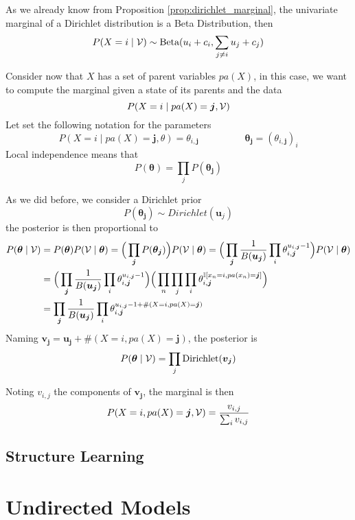 As we already know from Proposition \ref{prop:dirichlet_marginal}, the univariate marginal of a Dirichlet distribution is a
Beta Distribution, then
\[
  P(X = i \mid \mathcal{V}) \sim \text{Beta}(u_{i} + c_{i}, \sum_{j\neq i} u_{j} + c_{j})
\]

Consider now that \(X\) has a set of parent variables \(pa(X)\), in this case,
we want to compute the marginal given a state of its parents and the data
\[
  P(X = i \mid pa(X) = \bm{j}, \mathcal{V})
\]
Let set the following notation for the parameters
\[
  P(X = i \mid pa(X) = \bm{j}, \theta) = \theta_{i,\bm{j}} \hspace{2cm} \bm{\theta_{j}} = (\theta_{i,\bm{j}})_{i}
\]
Local independence means that
\[
  P(\bm{\theta}) = \prod_{j}P(\bm{\theta_{j}})
\]

As we did before, we consider a Dirichlet prior
\[
  P(\bm{\theta_{j}})\sim Dirichlet(\bm{u}_{j})
\]
the posterior is then proportional to
\[
  \begin{aligned}
    P(\bm{\theta} \mid \mathcal{V}) &= P(\bm{\theta})P(\mathcal{V} \mid \bm{\theta}) = \Big(\prod_{\bm{j}}P(\bm{\theta_{j}}) \Big)P(\mathcal{V} \mid \bm{\theta}) = \Big(\prod_{\bm{j}}\frac{1}{B(\bm{u_{j}})}\prod_{i}\theta_{i,\bm{j}}^{u_{i,\bm{j}}-1}\Big) P(\mathcal{V} \mid \bm{\theta})\\
    &= \Big(\prod_{\bm{j}}\frac{1}{B(\bm{u_{j}})}\prod_{i}\theta_{i,\bm{j}}^{u_{i,\bm{j}}-1}\Big) \Big(\prod_{n}\prod_{j}\prod_{i} \theta_{i,\bm{j}}^{\mathbb{I}[x_{n} = i, pa(x_{n}) = \bm{j}]}\Big)\\
    &= \prod_{\bm{j}}\frac{1}{B(\bm{u_{j}})}\prod_{i}\theta_{i,\bm{j}}^{u_{i,\bm{j}}-1 + \#(X = i,pa(X)=\bm{j})}
  \end{aligned}
\]
Naming \(\bm{v_{j}} = \bm{u_{j}} + \#(X = i, pa(X) = \bm{j})\), the posterior
is
\[
  P(\bm{\theta} \mid \mathcal{V}) = \prod_{j}\text{Dirichlet}(\bm{v_{j}})
\]

Noting \(v_{i,j}\) the components of \(\bm{v_{j}}\), the marginal is then
\[
  P(X=i, pa(X) = \bm{j}, \mathcal{V}) = \frac{v_{i,j}}{\sum_{i}v_{i,j}}
\]

\subsection{Structure Learning}

\section{Undirected Models}
